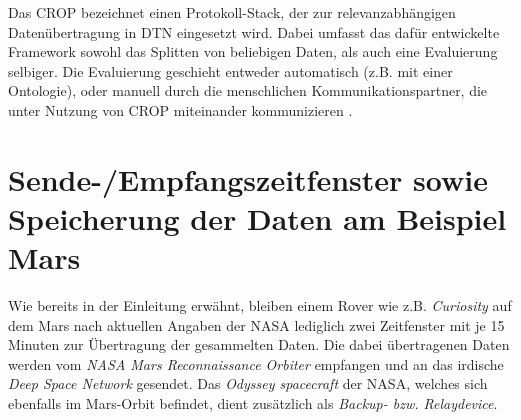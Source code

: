 Das \gls{CROP} bezeichnet einen Protokoll-Stack, der zur relevanzabh{\"a}ngigen
Daten{\"u}bertragung in \gls{DTN} eingesetzt wird. Dabei
umfasst das daf{\"u}r entwickelte Framework sowohl das Splitten von beliebigen
Daten, als auch eine Evaluierung selbiger. Die Evaluierung geschieht entweder
automatisch (z.B. mit einer Ontologie), oder manuell durch die menschlichen
Kommunikationspartner, die unter Nutzung von CROP miteinander kommunizieren
\cite{Daher}.

\section{Sende-/Empfangszeitfenster sowie Speicherung der Daten am Beispiel
Mars}

Wie bereits in der Einleitung erw{\"a}hnt, bleiben einem Rover wie z.B.
\textit{Curiosity} auf dem Mars nach aktuellen Angaben der NASA \cite{web5}
lediglich zwei Zeitfenster mit je 15 Minuten zur {\"U}bertragung der gesammelten
Daten. Die dabei {\"u}bertragenen Daten werden vom \textit{NASA Mars
Reconnaissance Orbiter} empfangen und an das irdische \textit{Deep Space
Network} gesendet. Das \textit{Odyssey spacecraft} der NASA, welches
sich ebenfalls im Mars-Orbit befindet, dient zus{\"a}tzlich als \textit{Backup-
bzw. Relaydevice}.
\label{Empfangsfenster}